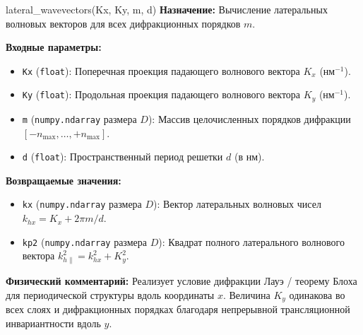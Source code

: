 \documentclass[a4paper,11pt]{article}
\begin{document}
\begin{funcbox}{lateral\_wavevectors(Kx, Ky, m, d)}
\textbf{Назначение:} Вычисление латеральных волновых векторов для всех дифракционных порядков $m$.

\textbf{Входные параметры:}
\begin{itemize}
    \item \texttt{Kx} (\texttt{float}): Поперечная проекция падающего волнового вектора $K_x$ ($\text{нм}^{-1}$).
    \item \texttt{Ky} (\texttt{float}): Продольная проекция падающего волнового вектора $K_y$ ($\text{нм}^{-1}$).
    \item \texttt{m} (\texttt{numpy.ndarray} размера $D$): Массив целочисленных порядков дифракции $[-n_{\max}, \dots, +n_{\max}]$.
    \item \texttt{d} (\texttt{float}): Пространственный период решетки $d$ (в нм).
\end{itemize}

\textbf{Возвращаемые значения:}
\begin{itemize}
    \item \texttt{kx} (\texttt{numpy.ndarray} размера $D$): Вектор латеральных волновых чисел $k_{hx} = K_x + 2\pi m / d$.
    \item \texttt{kp2} (\texttt{numpy.ndarray} размера $D$): Квадрат полного латерального волнового вектора $k_{h\parallel}^2 = k_{hx}^2 + K_y^2$.
\end{itemize}

\textbf{Физический комментарий:} Реализует условие дифракции Лауэ / теорему Блоха для периодической структуры вдоль координаты $x$. Величина $K_y$ одинакова во всех слоях и дифракционных порядках благодаря непрерывной трансляционной инвариантности вдоль $y$.
\end{funcbox}
\end{document}
